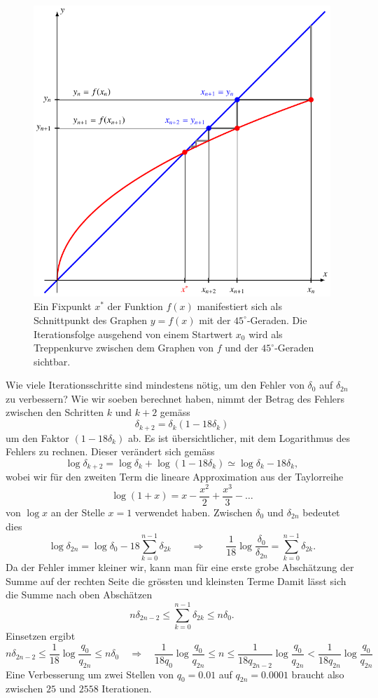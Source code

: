 \begin{beispiel}
\begin{figure}
\centering
\includegraphics{chapters/10-arithmetik/figures/iteration.pdf}
\caption{Ein Fixpunkt $x^*$ der Funktion $f(x)$ manifestiert sich als
Schnittpunkt des Graphen $y=f(x)$ mit der $45^\circ$-Geraden.
Die Iterationsfolge ausgehend von einem Startwert $x_0$ wird als
Treppenkurve zwischen dem Graphen von $f$ und der $45^\circ$-Geraden
sichtbar.
\label{buch:figure:iterationprinzip}}
\end{figure}

Wie viele Iterationsschritte sind mindestens nötig, um den Fehler von
$\delta_0$ auf $\delta_{2n}$ zu verbessern?
Wie wir soeben berechnet haben, nimmt der Betrag des Fehlers zwischen
den Schritten $k$ und $k+2$ gemäss
\[
\delta_{k+2} = \delta_{k} (1-18\delta_k)
\]
um den Faktor $(1-18\delta_k)$ ab.
Es ist übersichtlicher, mit dem Logarithmus des Fehlers zu rechnen.
Dieser verändert sich gemäss
\[
\log \delta_{k+2}
=
\log \delta_{k} + \log(1-18\delta_k)
\simeq
\log\delta_k - 18\delta_k,
\]
wobei wir für den zweiten Term die lineare Approximation aus der
Taylorreihe
\[
\log (1+x) = x - \frac{x^2}2 + \frac{x^3}3 -\dots
\]
von 
$\log x $ an der Stelle $x=1$ verwendet haben.
Zwischen $\delta_0$ und $\delta_{2n}$ bedeutet dies
\[
\log\delta_{2n}
=
\log\delta_0
-18
\sum_{k=0}^{n-1} \delta_{2k}
\qquad\Rightarrow\qquad
\frac1{18}
\log\frac{\delta_0}{\delta_{2n}}
=
\sum_{k=0}^{n-1}\delta_{2k}.
\]
Da der Fehler immer kleiner wir, kann man für eine erste grobe Abschätzung
der Summe auf der rechten Seite die grössten und kleinsten Terme
Damit lässt sich die Summe nach oben Abschätzen
\[
n\delta_{2n-2}
\le
\sum_{k=0}^{n-1}\delta_{2k}
\le
n\delta_0.
\]
Einsetzen ergibt
\[
n\delta_{2n-2}
\le
\frac{1}{18}
\log\frac{q_{0}}{q_{2n}}
\le
n\delta_0
\quad\Rightarrow\quad
\frac{1}{18q_0}
\log\frac{q_{0}}{q_{2n}}
\le
n
\le
\frac{1}{18q_{2n-2}}
\log\frac{q_{0}}{q_{2n}}
<
\frac{1}{18q_{2n}}
\log\frac{q_{0}}{q_{2n}}
\]
Eine Verbesserung um zwei Stellen von $q_0=0.01$ auf $q_{2n}=0.0001$ braucht
also zwischen $25$ und $2558$ Iterationen.
\end{beispiel}

